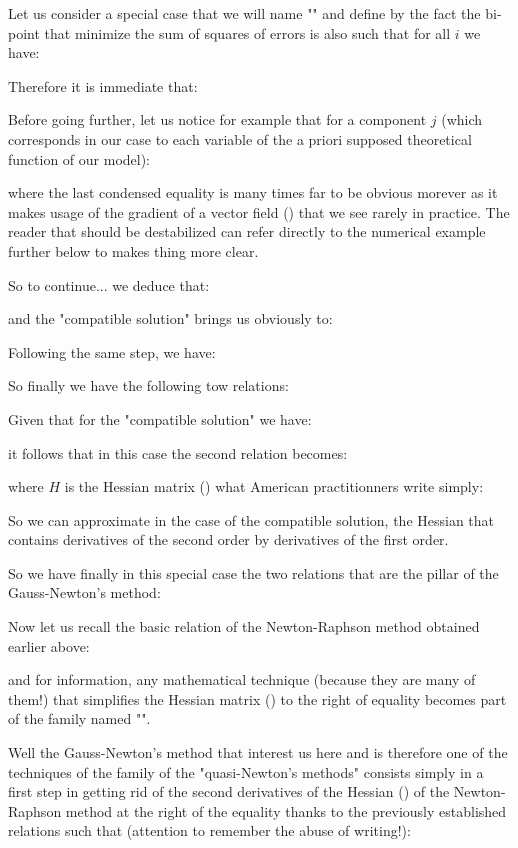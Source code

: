 	Let us consider a special case that we will name "" and define by the fact the bi-point that minimize the sum of squares of errors is also such that for all $i$ we have:
	
	Therefore it is immediate that:
	
	Before going further, let us notice for example that for a component $j$ (which corresponds in our case to each variable of the a priori supposed theoretical function of our model):
	
	where the last condensed equality is many times far to be obvious morever as it makes usage of the gradient of a vector field () that we see rarely in practice. The reader that should be destabilized can refer directly to the numerical example further below to makes thing more clear.

	So to continue... we deduce that:
	
	and the "compatible solution" brings us obviously to:
	
	Following the same step, we have:
	
	So finally we have the following tow relations:
	
	Given that for the "compatible solution" we have:
	
	it follows that in this case the second relation becomes:
	
	where $H$ is the Hessian matrix () what American practitionners write simply:
	
	So we can approximate in the case of the compatible solution, the Hessian that contains derivatives of the second order by derivatives of the first order.

	So we have finally in this special case the two relations that are the pillar of the Gauss-Newton's method:
	
	Now let us recall the basic relation of the Newton-Raphson method obtained earlier above:
	
	and for information, any mathematical technique (because they are many of them!) that simplifies the Hessian matrix () to the right of equality becomes part of the family named "".
	
	Well the Gauss-Newton's method that interest us here and is therefore one of the techniques of the family of the "quasi-Newton's methods" consists simply in a first step in getting rid of the second derivatives of the Hessian () of the Newton-Raphson method at the right of the equality thanks to the previously established relations such that (attention to remember the abuse of writing!):
	
